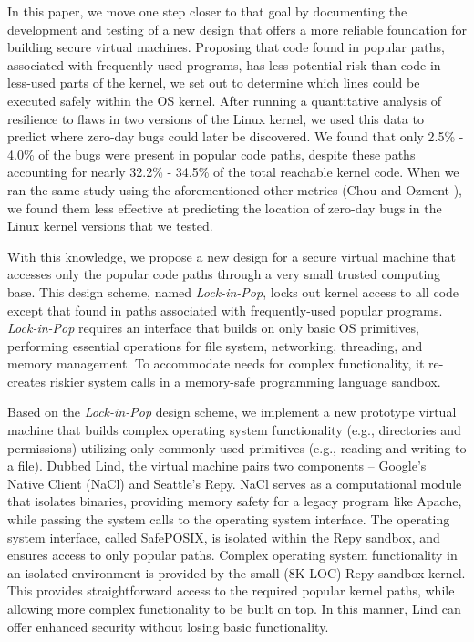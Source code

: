 In this paper, we move one step closer to that goal by documenting the development and 
testing of a new design that offers a more reliable foundation for building secure virtual machines. 
Proposing that code found in popular paths, associated with frequently-used programs, 
has less potential risk than code in less-used parts of the kernel, we set out to determine 
which lines could be executed safely within the OS kernel. 
After running a quantitative analysis of resilience to flaws in two versions of the Linux kernel, 
we used this data to predict where zero-day bugs could later be discovered. 
We found that only 2.5\% - 4.0\% of the bugs were present in popular code paths, 
despite these paths accounting for nearly 32.2\% - 34.5\% of the total reachable kernel code. 
When we ran the same study using the aforementioned other metrics (Chou \cite{PittSFIeld} and Ozment \cite{ozment2006milk}), 
we found them less  effective at predicting the location of zero-day bugs in the Linux kernel versions that we tested.

With this knowledge, we propose a new design for a secure virtual machine that 
accesses only the popular code paths through a very small trusted computing base. 
This design scheme, named \emph{Lock-in-Pop}, locks out kernel access to all code except 
that found in paths associated with frequently-used popular programs. \emph{Lock-in-Pop} requires an interface 
that builds on only basic OS primitives, performing essential operations for file system, 
networking, threading, and memory management. 
To accommodate needs for complex functionality, it re-creates riskier system calls in a memory-safe programming language sandbox.

Based on the \emph{Lock-in-Pop} design scheme, we implement a new prototype virtual machine that 
builds complex operating system functionality (e.g., directories and permissions) utilizing only commonly-used primitives (e.g., reading and writing to a file). 
Dubbed Lind, the virtual machine pairs two components -- Google's Native Client (NaCl) and Seattle's Repy. 
NaCl serves as a computational module that isolates binaries, providing memory safety for a legacy program like Apache, 
while passing the system calls to the operating system interface. 
The operating system interface, called SafePOSIX, is isolated within the Repy sandbox, and ensures access to only popular paths. 
Complex operating system functionality in an isolated environment is provided by the small (8K LOC) Repy sandbox kernel. 
This provides straightforward access to the required popular kernel paths, 
while allowing more complex functionality to be built on top. 
In this manner, Lind can offer enhanced security without losing basic functionality. 

